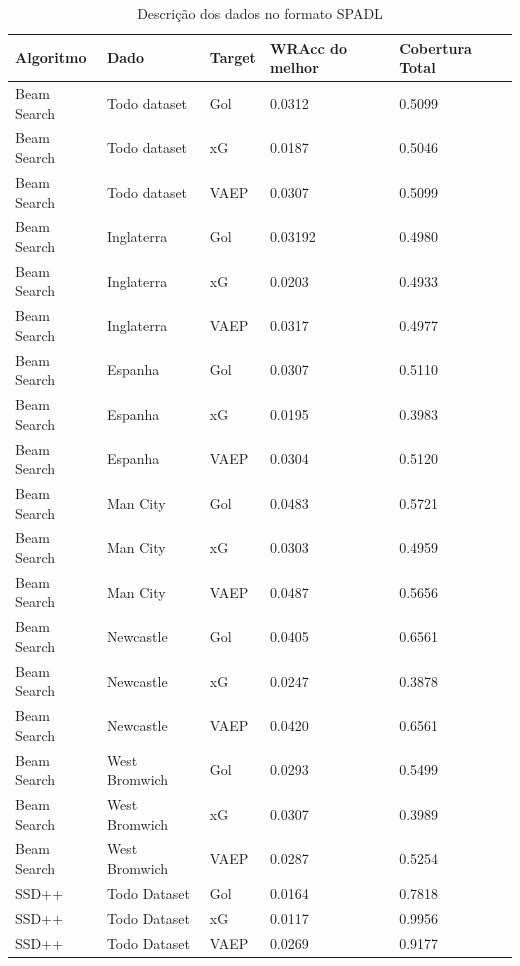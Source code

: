 \documentclass{article}
\begin{document}
\begin{table}[H]
	\centering
	\begin{tabular}{|l|l|l|l|l|}
		\hline
		\textbf{Algoritmo} & \textbf{Dado} &  \textbf{Target} & 
		\textbf{WRAcc do melhor} & \textbf{Cobertura Total}
		\\
		\hline
		Beam Search & Todo dataset & Gol & 0.0312 & 0.5099 
		\\
		\hline
		Beam Search & Todo dataset & xG & 0.0187 & 0.5046 
		\\
		\hline
		Beam Search & Todo dataset & VAEP & 0.0307 & 0.5099 
		\\
		\hline
		Beam Search & Inglaterra & Gol & 0.03192 & 0.4980 
		\\
		\hline
		Beam Search & Inglaterra & xG & 0.0203 & 0.4933 
		\\
		\hline
		Beam Search & Inglaterra & VAEP & 0.0317 & 0.4977
		\\
		\hline
		Beam Search & Espanha & Gol & 0.0307 & 0.5110 
		\\
		\hline
		Beam Search & Espanha & xG & 0.0195 & 0.3983 
		\\
		\hline
		Beam Search & Espanha & VAEP & 0.0304 & 0.5120 
		\\
		\hline
		Beam Search & Man City & Gol & 0.0483 & 0.5721 
		\\
		\hline
		Beam Search & Man City & xG & 0.0303 & 0.4959 
		\\
		\hline
		Beam Search & Man City & VAEP & 0.0487 & 0.5656 
		\\
		\hline
		Beam Search & Newcastle & Gol & 0.0405 & 0.6561 
		\\
		\hline
		Beam Search & Newcastle & xG & 0.0247 & 0.3878 
		\\
		\hline
		Beam Search & Newcastle & VAEP & 0.0420 & 0.6561 
		\\
		\hline
		Beam Search & West Bromwich & Gol & 0.0293 & 0.5499 
		\\
		\hline
		Beam Search & West Bromwich & xG & 0.0307 & 0.3989 
		\\
		\hline
		Beam Search & West Bromwich & VAEP & 0.0287 & 0.5254 
		\\
		\hline
		SSD++ & Todo Dataset & Gol & 0.0164 & 0.7818 
		\\
		\hline
		SSD++ & Todo Dataset & xG & 0.0117 & 0.9956
		\\
		\hline
		SSD++ & Todo Dataset & VAEP & 0.0269 & 0.9177
		\\
		\hline
	\end{tabular}
	\caption{Descrição dos dados no formato SPADL}
	\label{tab:resultMetricas}
\end{table}
\end{document}

